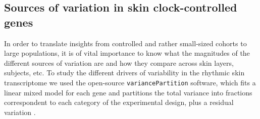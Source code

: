 {%


\subsection*{Sources of variation in skin clock-controlled genes}
\normalsize In order to translate insights from controlled and rather small-sized cohorts to large populations, it is of vital importance to know what the magnitudes of the different sources of variation are and how they compare across skin layers, subjects, etc. To study the different drivers of variability in the rhythmic skin transcriptome we used the open-source \texttt{variancePartition} software, which fits a linear mixed model for each gene and partitions the total variance into fractions correspondent to each category of the experimental design, plus a residual variation \cite{Hoffman2016}.\\

}
